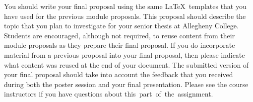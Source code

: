 You should write your final proposal using the same \LaTeX\ templates that you have used for the previous module
proposals. This proposal should describe the topic that you plan to investigate for your senior thesis at Allegheny
College. Students are encouraged, although not required, to reuse content from their module proposals as they prepare
their final proposal. If you do incorporate material from a previous proposal into your final proposal, then please
indicate what content was reused at the end of your document. The submitted version of your final proposal should take
into account the feedback that you received during both the poster session and your final presentation. Please see the
course instructors if you have questions about \mbox{this part of the assignment}.


